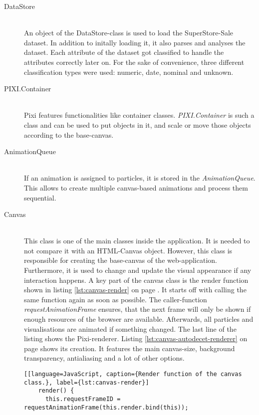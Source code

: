 \begin{description}
\item[DataStore] \hfill \\
An object of the DataStore-class is used to load the SuperStore-Sale dataset. In addition to initally loading it, it also parses and analyses the dataset. Each attribute of the dataset got classified to handle the attributes correctly later on. For the sake of convenience, three different classification types were used: numeric, date, nominal and unknown.

\item[PIXI.Container] \hfill \\
\ac{Pixi} features functionalities like container classes. \textit{PIXI.Container} is such a class and can be used to put objects in it, and scale or move those objects according to the base-canvas.

\item[AnimationQueue] \hfill \\
If an animation is assigned to particles, it is stored in the \textit{AnimationQueue}. This allows to create multiple canvas-based animations and process them sequential.

\item[Canvas] \hfill \\
This class is one of the main classes inside the application. It is needed to not compare it with an HTML-Canvas object. However, this class is responsible for creating the base-canvas of the web-application. Furthermore, it is used to change and update the visual appearance if any interaction happens. A key part of the canvas class is the render function shown in listing \ref{lst:canvas-render} on page \pageref{lst:canvas-render}. It starts off with calling the same function again as soon as possible. The caller-function \textit{requestAnimationFrame} ensures, that the next frame will only be shown if enough resources of the browser are available. Afterwards, all particles and visualisations are animated if something changed. The last line of the listing shows the \ac{Pixi}-renderer. Listing \ref{lst:canvas-autodecet-renderer} on page \pageref{lst:canvas-autodecet-renderer} shows its creation. It features the main canvas-size, background transparency, antialiasing and a lot of other options.

\begin{lstlisting}[[language=JavaScript, caption={Render function of the canvas class.}, label={lst:canvas-render}]
    render() {
      this.requestFrameID = requestAnimationFrame(this.render.bind(this));


\end{lstlisting}
\end{description}
